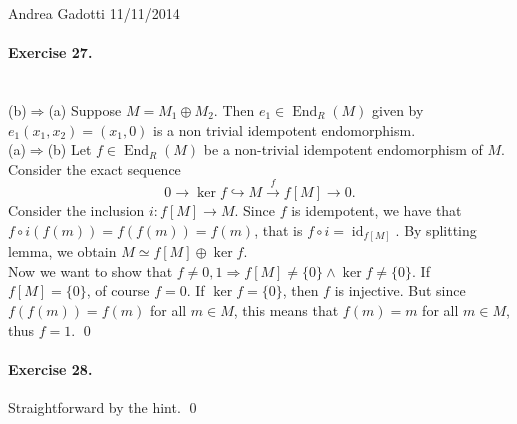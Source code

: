 \documentclass[12pt,a4paper]{report}
\theoremstyle{definition}
\theoremstyle{num.custom-title}
\DeclareMathOperator{\id}{id}
\DeclareMathOperator{\End}{End}
\DeclareMathOperator{\imp}{\Rightarrow}
\begin{document}
\noindent Andrea Gadotti \hfill 11/11/2014

\paragraph{Exercise 27.} \ \\
(b)$\imp$(a) Suppose $M=M_1 \oplus M_2$. Then $e_1 \in \End_R(M)$ given by $e_1(x_1,x_2)=(x_1,0)$ is a non trivial idempotent endomorphism.\\
(a)$\imp$(b) Let $f \in \End_R(M)$ be a non-trivial idempotent endomorphism of $M$. Consider the exact sequence
\[
0 \to \ker f \hookrightarrow M \stackrel{f}{\to} f[M] \to 0.
\]
Consider the inclusion $i : f[M] \to M$. Since $f$ is idempotent, we have that $f \circ i (f(m)) = f(f(m)) = f(m)$, that is $f \circ i = \id_{f[M]}$. By splitting lemma, we obtain $M \simeq f[M] \oplus \ker f$.\\
Now we want to show that $f \neq 0,1 \imp f[M] \neq \{0\} \wedge \ker f \neq \{0\}$. If $f[M]=\{0\}$, of course $f=0$. If $\ker f = \{0\}$, then $f$ is injective. But since $f(f(m))=f(m)$ for all $m \in M$, this means that $f(m)=m$ for all $m \in M$, thus $f=1$. \qed

\paragraph{Exercise 28.} Straightforward by the hint. \qed
\end{document}
